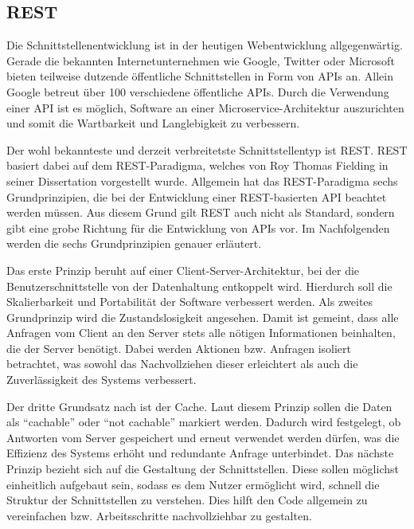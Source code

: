 \subsection{\acl*{REST}}
\label{sec:grundlagen:rest}
Die Schnittstellenentwicklung ist in der heutigen Webentwicklung allgegenwärtig.
Gerade die bekannten Internetunternehmen wie Google\autocite{MS-GoogleLLC.2020}, Twitter\autocite{MS-TwitterInc..01.03.2020} oder Microsoft\autocite{MS-MicrosoftCorporation.21.05.2018} bieten teilweise dutzende öffentliche Schnittstellen in Form von \acp{API} an.
Allein Google betreut über 100 verschiedene öffentliche \acp{API}.\autocite{rf-google-api-alle}
Durch die Verwendung einer \ac{API} ist es möglich, Software an einer Microservice-Architektur auszurichten und somit die Wartbarkeit und Langlebigkeit zu verbessern.\autocite{rf-fowler2015microservices}

Der wohl bekannteste und derzeit verbreitetste Schnittstellentyp ist \ac{REST}.
\ac{REST} basiert dabei auf dem \ac{REST}-Paradigma, welches von Roy Thomas Fielding in seiner Dissertation\autocite{MS-Fielding.} vorgestellt wurde. Allgemein hat das \ac{REST}-Paradigma sechs Grundprinzipien, die bei der Entwicklung einer \ac{REST}-basierten \ac{API} beachtet werden müssen. 
Aus diesem Grund gilt \ac{REST} auch nicht als Standard, sondern gibt eine grobe Richtung für die Entwicklung von \acp{API} vor.
Im Nachfolgenden werden die sechs Grundprinzipien genauer erläutert.

Das erste Prinzip beruht auf einer Client-Server-Architektur, bei der die Benutzerschnittstelle von der Datenhaltung entkoppelt wird. %
Hierdurch soll die Skalierbarkeit und Portabilität der Software verbessert werden.
Als zweites Grundprinzip wird die Zustandslosigkeit angesehen.
Damit ist gemeint, dass alle Anfragen vom Client an den Server stets alle nötigen Informationen beinhalten, die der Server benötigt.
Dabei werden Aktionen bzw. Anfragen isoliert betrachtet, was sowohl das Nachvollziehen dieser erleichtert als auch die Zuverlässigkeit des Systems verbessert.

Der dritte Grundsatz nach \citeauthor{MS-Fielding.} ist der Cache. 
Laut diesem Prinzip sollen die Daten als \enquote{cachable} oder \enquote{not cachable} markiert werden.
Dadurch wird festgelegt, ob Antworten vom Server gespeichert und erneut verwendet werden dürfen, was die Effizienz des Systems erhöht und redundante Anfrage unterbindet.
Das nächste Prinzip bezieht sich auf die Gestaltung der Schnittstellen. 
Diese sollen möglichst einheitlich aufgebaut sein, sodass es dem Nutzer ermöglicht wird, schnell die Struktur der Schnittstellen zu verstehen. 
Dies hilft den Code allgemein zu vereinfachen bzw. Arbeitsschritte nachvollziehbar zu gestalten.

